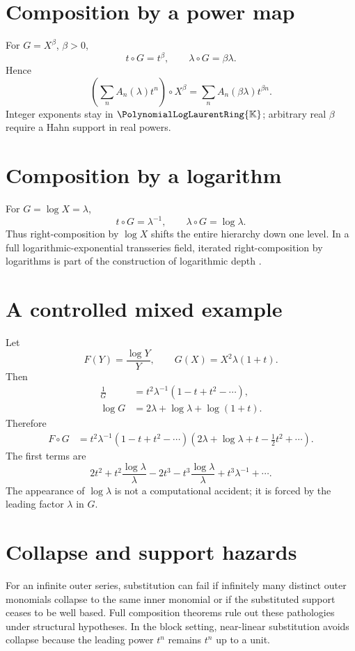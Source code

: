 \documentclass[11pt,openany]{book}
\theoremstyle{definition}
\theoremstyle{plain}
\theoremstyle{remark}
\newcommand{\K}{\mathbb{K}}
\newcommand{\Plog}{\PolynomialLogLaurentRing{\K}}
\begin{document}
\section{Composition by a power map}
For \(G=X^\beta\), \(\beta>0\),
\[
 t\circ G=t^\beta,
 \qquad
 \lambda\circ G=\beta\lambda.
\]
Hence
\begin{equation}\label{eq:power-composition}
 \left(\sum_nA_n(\lambda)t^n\right)\circ X^\beta
 =\sum_nA_n(\beta\lambda)t^{\beta n}.
\end{equation}
Integer exponents stay in \(\Plog\); arbitrary real \(\beta\) require a Hahn support in real powers.

\section{Composition by a logarithm}
For \(G=\log X=\lambda\),
\[
 t\circ G=\lambda^{-1},
 \qquad
 \lambda\circ G=\log\lambda.
\]
Thus right-composition by \(\log X\) shifts the entire hierarchy down one level. In a full logarithmic-exponential transseries field, iterated right-composition by logarithms is part of the construction of logarithmic depth \cite{edgar-beginners,vdhoeven-book}.

\section{A controlled mixed example}
Let
\[
 F(Y)=\frac{\log Y}{Y},
 \qquad
 G(X)=X^2\lambda(1+t).
\]
Then
\begin{align*}
 \frac1G&=t^2\lambda^{-1}(1-t+t^2-\cdots),\\
 \log G&=2\lambda+\log\lambda+\log(1+t).
\end{align*}
Therefore
\begin{align*}
 F\circ G
 &=t^2\lambda^{-1}(1-t+t^2-\cdots)
 \left(2\lambda+\log\lambda+t-\frac12t^2+\cdots\right).
\end{align*}
The first terms are
\[
 2t^2+t^2\frac{\log\lambda}{\lambda}
 -2t^3-t^3\frac{\log\lambda}{\lambda}
 +t^3\lambda^{-1}+\cdots.
\]
The appearance of \(\log\lambda\) is not a computational accident; it is forced by the leading factor \(\lambda\) in \(G\).

\section{Collapse and support hazards}
For an infinite outer series, substitution can fail if infinitely many distinct outer monomials collapse to the same inner monomial or if the substituted support ceases to be well based. Full composition theorems rule out these pathologies under structural hypotheses. In the block setting, near-linear substitution avoids collapse because the leading power \(t^n\) remains \(t^n\) up to a unit.
\end{document}
